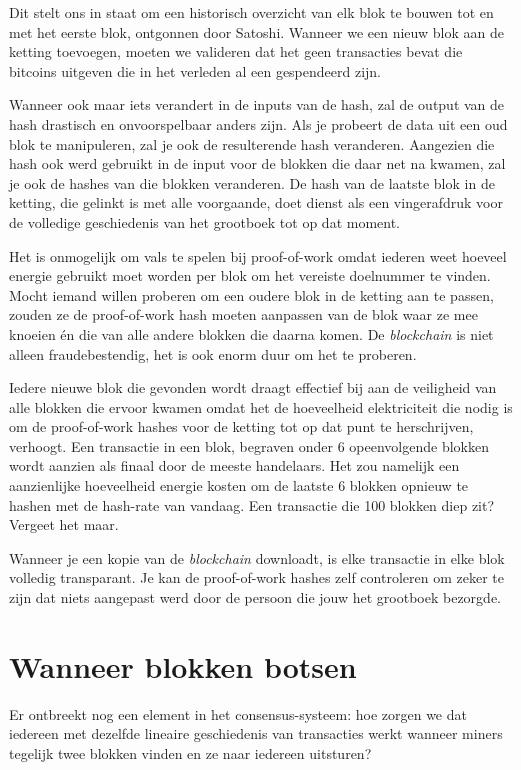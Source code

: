 \documentclass[smalldemyvopaper,11pt,twoside,onecolumn,openright,extrafontsizes]{memoir}
\begin{document}
Dit stelt ons in staat om een historisch overzicht van elk blok te bouwen tot en met het eerste blok, ontgonnen door Satoshi. Wanneer we een nieuw blok aan de ketting toevoegen, moeten we valideren dat het geen transacties bevat die bitcoins uitgeven die in het verleden al een gespendeerd zijn.

Wanneer ook maar iets verandert in de inputs van de hash, zal de output van de hash drastisch en onvoorspelbaar anders zijn. Als je probeert de data uit een oud blok te manipuleren, zal je ook de resulterende hash veranderen. Aangezien die hash ook werd gebruikt in de input voor de blokken die daar net na kwamen, zal je ook de hashes van die blokken veranderen. De hash van de laatste blok in de ketting, die gelinkt is met alle voorgaande, doet dienst als een vingerafdruk voor de volledige geschiedenis van het grootboek tot op dat moment.

Het is onmogelijk om vals te spelen bij proof-of-work omdat iederen weet hoeveel energie gebruikt moet worden per blok om het vereiste doelnummer te vinden. Mocht iemand willen proberen om een oudere blok in de ketting aan te passen, zouden ze de proof-of-work hash moeten aanpassen van de blok waar ze mee knoeien én die van alle andere blokken die daarna komen. De \textit{blockchain} is niet alleen fraudebestendig, het is ook enorm duur om het te proberen.

Iedere nieuwe blok die gevonden wordt draagt effectief bij aan de veiligheid van alle blokken die ervoor kwamen omdat het de hoeveelheid elektriciteit die nodig is om de proof-of-work hashes voor de ketting tot op dat punt te herschrijven, verhoogt. Een transactie in een blok, begraven onder 6 opeenvolgende blokken wordt aanzien als finaal door de meeste handelaars. Het zou namelijk een aanzienlijke hoeveelheid energie kosten om de laatste 6 blokken opnieuw te hashen met de hash-rate van vandaag. Een transactie die 100 blokken diep zit? Vergeet het maar.

Wanneer je een kopie van de \textit{blockchain} downloadt, is elke transactie in elke blok volledig transparant. Je kan de proof-of-work hashes zelf controleren om zeker te zijn dat niets aangepast werd door de persoon die jouw het grootboek bezorgde.

\section{Wanneer blokken botsen}
Er ontbreekt nog een element in het consensus-systeem: hoe zorgen we dat iedereen met dezelfde lineaire geschiedenis van transacties werkt wanneer miners tegelijk twee blokken vinden en ze naar iedereen uitsturen?
\end{document}
